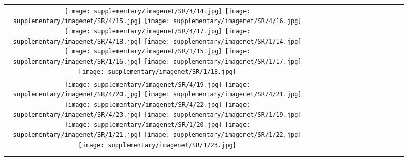 \begin{figure*}[tb!]
{\begin{tabular}{c c c c c c c c c c c c c c }
\tabularnewline
  \texttt{[image: supplementary/imagenet/SR/4/14.jpg]}
  \texttt{[image: supplementary/imagenet/SR/4/15.jpg]}
  \texttt{[image: supplementary/imagenet/SR/4/16.jpg]}
  \texttt{[image: supplementary/imagenet/SR/4/17.jpg]}
  \texttt{[image: supplementary/imagenet/SR/4/18.jpg]}
    \hspace{5mm}
  \texttt{[image: supplementary/imagenet/SR/1/14.jpg]}
  \texttt{[image: supplementary/imagenet/SR/1/15.jpg]}
  \texttt{[image: supplementary/imagenet/SR/1/16.jpg]}
  \texttt{[image: supplementary/imagenet/SR/1/17.jpg]}
  \texttt{[image: supplementary/imagenet/SR/1/18.jpg]}

\tabularnewline
  \texttt{[image: supplementary/imagenet/SR/4/19.jpg]}
  \texttt{[image: supplementary/imagenet/SR/4/20.jpg]}
  \texttt{[image: supplementary/imagenet/SR/4/21.jpg]}
  \texttt{[image: supplementary/imagenet/SR/4/22.jpg]}
  \texttt{[image: supplementary/imagenet/SR/4/23.jpg]}
    \hspace{5mm}
  \texttt{[image: supplementary/imagenet/SR/1/19.jpg]}
  \texttt{[image: supplementary/imagenet/SR/1/20.jpg]}
  \texttt{[image: supplementary/imagenet/SR/1/21.jpg]}
  \texttt{[image: supplementary/imagenet/SR/1/22.jpg]}
  \texttt{[image: supplementary/imagenet/SR/1/23.jpg]}
    \tabularnewline

 \hspace{0.5mm}
  \tabularnewline
\vspace{2mm}
\vspace{-2\baselineskip}
\end{tabular}}
\vspace{-0.8cm}
\hspace{20pt}\label{fig:sup1b}
\vspace{-8mm}
\end{figure*}%